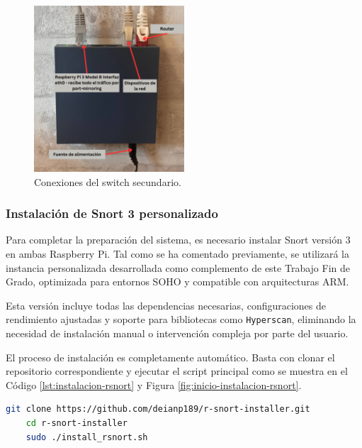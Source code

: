 \documentclass[11pt,a4paper,twoside]{report}
\begin{document}
\begin{figure}[H]
	\centering
	\includegraphics[width=0.5\textwidth]{install/0.4.png}
	\caption{Conexiones del switch secundario.}
	\label{fig:switch-subred2}
\end{figure}


\subsubsection{Instalación de Snort 3 personalizado}

Para completar la preparación del sistema, es necesario instalar Snort versión 3 en ambas Raspberry Pi. Tal como se ha comentado previamente, se utilizará la instancia personalizada desarrollada como complemento de este Trabajo Fin de Grado, optimizada para entornos SOHO y compatible con arquitecturas ARM.\newline

Esta versión incluye todas las dependencias necesarias, configuraciones de rendimiento ajustadas y soporte para bibliotecas como \texttt{Hyperscan}, eliminando la necesidad de instalación manual o intervención compleja por parte del usuario.\newline

El proceso de instalación es completamente automático. Basta con clonar el repositorio correspondiente y ejecutar el script principal como se muestra en el Código \ref{lst:instalacion-rsnort} y Figura \ref{fig:inicio-instalacion-rsnort}.

\newpage

\begin{lstlisting}[language=bash, caption={Instalación de R-Snort personalizada.}, label={lst:instalacion-rsnort}]
	git clone https://github.com/deianp189/r-snort-installer.git
	cd r-snort-installer
	sudo ./install_rsnort.sh
\end{lstlisting}
\end{document}
